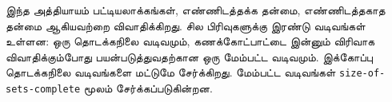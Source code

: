 \documentclass[../../../include/open-logic-chapter]{subfiles}
\begin{document}

\begin{editorial}
இந்த அத்தியாயம் பட்டியலாக்கங்கள், எண்ணிடத்தக்க தன்மை,
எண்ணிடத்தகாத தன்மை ஆகியவற்றை விவாதிக்கிறது.
சில பிரிவுகளுக்கு இரண்டு வடிவங்கள் உள்ளன:
ஒரு தொடக்கநிலை வடிவமும், கணக்கோட்பாட்டை இன்னும்
விரிவாக விவாதிக்கும்போது பயன்படுத்துவதற்கான ஒரு மேம்பட்ட
வடிவமும். இக்கோப்பு தொடக்கநிலை வடிவங்களை மட்டுமே சேர்க்கிறது.
மேம்பட்ட வடிவங்கள் \verb|size-of-sets-complete| மூலம் சேர்க்கப்படுகின்றன.
\end{editorial}











\OLEndChapterHook
\end{document}
